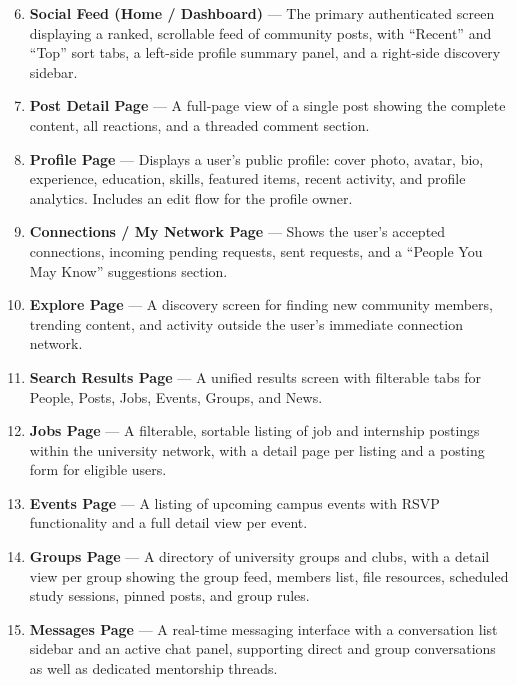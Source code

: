 \documentclass[12pt, a4paper]{article}
\begin{document}
\begin{enumerate}
\setcounter{enumi}{5}
    \item \textbf{Social Feed (Home / Dashboard)} --- The primary authenticated
    screen displaying a ranked, scrollable feed of community posts, with ``Recent''
    and ``Top'' sort tabs, a left-side profile summary panel, and a right-side
    discovery sidebar.

    \item \textbf{Post Detail Page} --- A full-page view of a single post showing
    the complete content, all reactions, and a threaded comment section.

    \item \textbf{Profile Page} --- Displays a user's public profile: cover photo,
    avatar, bio, experience, education, skills, featured items, recent activity,
    and profile analytics. Includes an edit flow for the profile owner.

    \item \textbf{Connections / My Network Page} --- Shows the user's accepted
    connections, incoming pending requests, sent requests, and a ``People You May
    Know'' suggestions section.

    \item \textbf{Explore Page} --- A discovery screen for finding new community
    members, trending content, and activity outside the user's immediate connection
    network.

    \item \textbf{Search Results Page} --- A unified results screen with filterable
    tabs for People, Posts, Jobs, Events, Groups, and News.

    \item \textbf{Jobs Page} --- A filterable, sortable listing of job and internship
    postings within the university network, with a detail page per listing and a
    posting form for eligible users.

    \item \textbf{Events Page} --- A listing of upcoming campus events with RSVP
    functionality and a full detail view per event.

    \item \textbf{Groups Page} --- A directory of university groups and clubs, with
    a detail view per group showing the group feed, members list, file resources,
    scheduled study sessions, pinned posts, and group rules.

    \item \textbf{Messages Page} --- A real-time messaging interface with a
    conversation list sidebar and an active chat panel, supporting direct and
    group conversations as well as dedicated mentorship threads.


\end{enumerate}
\end{document}
